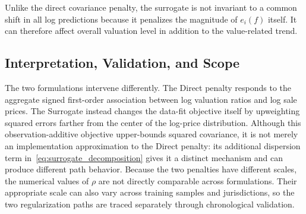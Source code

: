 \documentclass[10pt]{article}
\theoremstyle{definition}
\newcommand{\1}{\mathbf{1}}
\newcommand{\oldtext}[1]{\textcolor{blue}{\sout{#1}}}
\newcommand{\newtext}[1]{\textcolor{impGreen}{#1}}
\begin{document}
{Unlike the direct covariance penalty, the surrogate is not invariant to a common shift in all log predictions because it penalizes the magnitude of $e_i(f)$ itself. It can therefore affect 
\newtext{overall valuation level} in addition to the value-related trend. %
}


\subsection{{Interpretation, Validation, and Scope}}
\label{subsec:correction_scope}


{
\newtext{The two formulations intervene differently. The Direct penalty responds to the aggregate signed first-order association between log valuation ratios and log sale prices. The Surrogate instead changes the data-fit objective itself by upweighting squared errors farther from the center of the log-price distribution. Although this observation-additive objective upper-bounds squared covariance, it is not merely an implementation approximation to the Direct penalty: its additional dispersion term in~\eqref{eq:surrogate_decomposition} gives it a distinct mechanism and can produce different path behavior.} Because the two penalties have different scales, the numerical values of $\rho$ are not directly comparable across formulations. Their appropriate scale can also vary across training samples and jurisdictions, so the two regularization paths are traced separately through chronological validation.}
\end{document}
